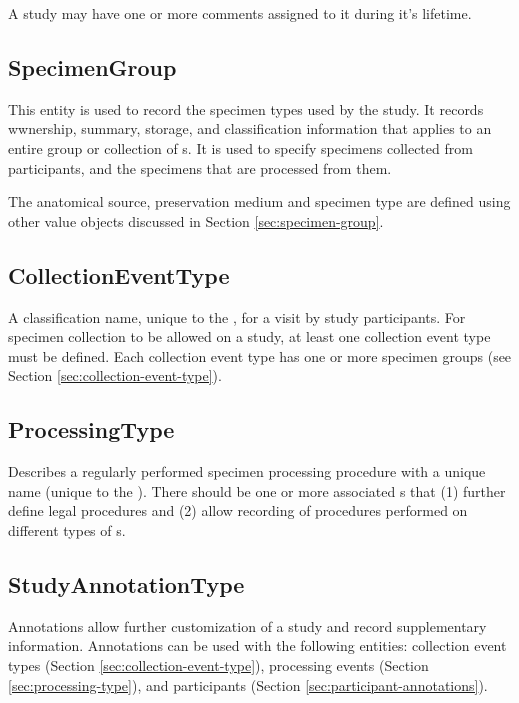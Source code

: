 A study may have one or more comments assigned to it during it's lifetime.

\subsection*{SpecimenGroup}

This entity is used to record the specimen types used by the study.  It records
wwnership, summary, storage, and classification information that applies to an
entire group or collection of s. It is used to specify
specimens collected from participants, and the specimens that are processed
from them.

The anatomical source, preservation medium and specimen type are defined using
other value objects discussed in Section \ref{sec:specimen-group}.

\subsection*{CollectionEventType}

A classification name, unique to the , for a visit by study
participants. For specimen collection to be allowed on a study, at least one
collection event type must be defined. Each collection event type has one or
more specimen groups (see Section \ref{sec:collection-event-type}).

\subsection*{ProcessingType}

Describes a regularly performed specimen processing procedure with a unique
name (unique to the ). There should be one or more associated
s that (1) further define legal procedures and (2)
allow recording of procedures performed on different types of
s.

\subsection*{StudyAnnotationType}

Annotations allow further customization of a study and record supplementary
information. Annotations can be used with the following entities: collection
event types (Section \ref{sec:collection-event-type}), processing events
(Section \ref{sec:processing-type}), and participants (Section
\ref{sec:participant-annotations}).


